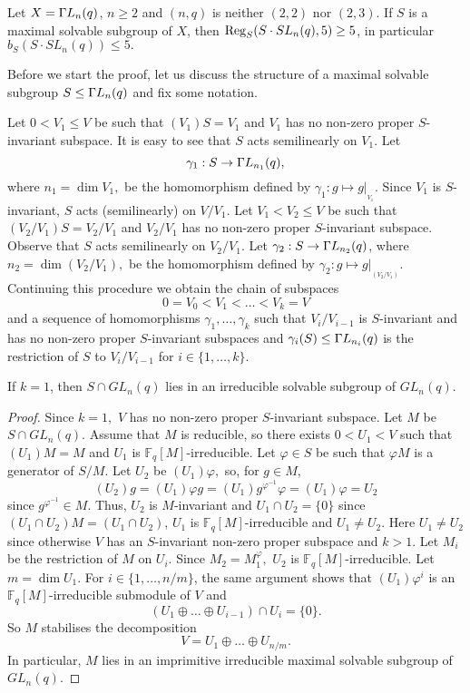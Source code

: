 \begin{T1}
Let $X={{\Gamma L}}_n(q)$, $n \ge 2$ and $(n,q)$ is neither $(2,2)$ nor $(2,3).$ If $S$ is a maximal solvable subgroup of $X$, 
 then $\mathrm{Reg}_S(S \cdot SL_n(q),5)\ge 5$, in particular $b_S(S \cdot SL_n(q)) \le 5.$
\end{T1}



Before we start the proof, let us discuss the structure of a maximal solvable subgroup $S \le {{\Gamma L}}_n(q)$ and fix some notation. 

Let $0< V_1 \le V$ be such that $(V_1)S=V_1$ and $V_1$ has no non-zero proper $S$-invariant subspace. It is easy to see that $S$ acts semilinearly on $V_1$. Let $$\gamma_1:S \to {{\Gamma L}}_{n_1}(q),$$ where $n_1=\dim V_1,$ be the homomorphism defined by $\gamma_1:g \mapsto g|_{_{V_1}}.$  Since $V_1$ is $S$-invariant, $S$ acts (semilinearly) on $V/V_1.$ Let $V_1 < V_2 \le V$ be such that $(V_2/V_1)S=V_2/V_1$ and $V_2/V_1$ has no non-zero proper $S$-invariant subspace.  Observe that $S$ acts semilinearly on $V_2/V_1$. Let $\gamma_2:S \to {{\Gamma L}}_{n_2}(q)$, where $n_2=\dim (V_2/V_1),$ be the homomorphism defined by $\gamma_2:g \mapsto g|_{_{(V_2/V_1)}}.$ 
Continuing this procedure we obtain the chain of subspaces 
\begin{equation}
\label{Gchain}
0=V_0<V_1< \ldots < V_k=V
\end{equation}
 and a sequence of homomorphisms $\gamma_1, \ldots, \gamma_k$ such that $V_{i}/V_{i-1}$ is $S$-invariant and has no  non-zero proper $S$-invariant  subspaces and $\gamma_i(S) \le {{\Gamma L}}_{n_i}(q)$ is the restriction of $S$ to $V_{i}/V_{i-1}$ for $i \in \{1, \ldots, k\}.$ 
 
 
 \begin{Lem}
 \label{GammairGL}
 If $k=1$, then $S \cap GL_n(q)$ lies in an irreducible solvable subgroup of $GL_n(q).$
 \end{Lem}
 \begin{proof}
 Since $k=1,$  $V$ has no  non-zero proper $S$-invariant subspace. Let $M$ be $S \cap GL_n(q).$ Assume that $M$ is reducible, so there exists $0<U_1 <V$ such that $(U_1)M=M$ and $U_1$ is $\mathbb{F}_q[M]$-irreducible. Let $\varphi \in S$ be such that $\varphi M$ is a generator of $S/M.$  Let $U_2$ be $(U_1)\varphi,$ so, for $g \in M$,
$$(U_2)g=(U_1)\varphi g=(U_1)g^{\varphi^{-1}}\varphi=(U_1)\varphi=U_2$$
since $g^{\varphi^{-1}} \in M.$  Thus, $U_2$ is $M$-invariant and $U_1 \cap U_2=\{0\}$ since $(U_1 \cap U_2)M=(U_1 \cap U_2)$, $U_1$ is $\mathbb{F}_q[M]$-irreducible and $U_1 \ne U_2$. Here $U_1 \ne U_2$ since otherwise $V$ has an $S$-invariant non-zero proper subspace and $k>1$. Let $M_i$ be the restriction of $M$ on $U_i$. Since $M_2=M_1^{\varphi},$ $U_2$ is $\mathbb{F}_q[M]$-irreducible. Let $m=\dim U_1$. For $i \in \{1, \ldots, n/m\}$, the same argument shows  that $(U_1) \varphi^i$ is an $\mathbb{F}_q[M]$-irreducible submodule of $V$ and 
$$(U_1 \oplus \ldots \oplus U_{i-1}) \cap U_i=\{0\}.$$ So $M$ stabilises the decomposition
$$V=U_1 \oplus \ldots \oplus U_{n/m}.$$  In particular, $M$ lies in an imprimitive irreducible maximal solvable subgroup of $GL_n(q).$
 \end{proof}
 
